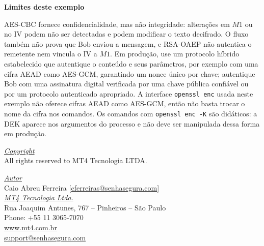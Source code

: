\textbf{Limites deste exemplo}

AES-CBC fornece confidencialidade, mas não integridade: alterações em \(M1\) ou no IV podem não ser detectadas e podem modificar o texto decifrado. O fluxo também não prova que Bob enviou a mensagem, e RSA-OAEP não autentica o remetente nem vincula o IV a \(M1\). Em produção, use um protocolo híbrido estabelecido que autentique o conteúdo e seus parâmetros, por exemplo com uma cifra AEAD como AES-GCM, garantindo um nonce único por chave; autentique Bob com uma assinatura digital verificada por uma chave pública confiável ou por um protocolo autenticado apropriado. A interface \texttt{openssl enc} usada neste exemplo não oferece cifras AEAD como AES-GCM, então não basta trocar o nome da cifra nos comandos. Os comandos com \texttt{openssl enc -K} são didáticos: a DEK aparece nos argumentos do processo e não deve ser manipulada dessa forma em produção.

\pagebreak

\vspace*{\fill}
\begin{flushright}
	\underline{\textit{Copyright}}\\
	All rights reserved to MT4 Tecnologia LTDA.\bigskip

	\underline{\textit{Autor}}\\
	Caio Abreu Ferreira [\href{mailto:cferreira@senhasegura.com}{cferreiras@senhasegura.com}] \bigskip\\
	
	\underline{\textit{MT4 Tecnologia Ltda.}}\\
	Rua Joaquim Antunes, 767 – Pinheiros – São Paulo\\
	Phone: +55 11 3065-7070\\
	\url{www.mt4.com.br}\\
	\href{mailto:support@senhasegura.com}{support@senhasegura.com}\\
\end{flushright}
